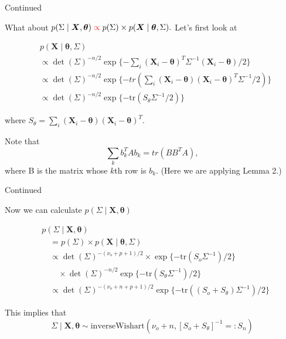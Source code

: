 \documentclass[ignorenonframetext,]{beamer}
\newcommand{\btheta}{{\bm\theta}}
\newcommand{\bX}   {\bm{X}}
\newcommand{\bx}{\ensuremath{\mathbf{X}}}
\begin{document}
\begin{frame}{Continued}

What about
\(p(\Sigma \mid \bX, \btheta) \; \textcolor{red}{\propto} \; p(\Sigma) \times p(\bX \mid \btheta, \Sigma).\)
Let's first look at

\begin{align}
&p(\bX \mid \btheta, \Sigma) \\
&\propto
\det(\Sigma)^{-n/2}\exp\{-
\sum_i (\bx_i - \btheta)^T\Sigma^{-1} (\bx_i - \btheta)/2
\}\\
&\propto
\det(\Sigma)^{-n/2}\exp\{- tr(
\sum_i  (\bx_i - \btheta)(\bx_i - \btheta)^T\Sigma^{-1}/2)
\}\\
&\propto 
\det(\Sigma)^{-n/2}\exp\{-
\text{tr}(S_\theta \Sigma^{-1}/2)
\}
\end{align}

where \(S_\theta = \sum_i (\bx_i - \btheta) (\bx_i - \btheta)^T.\)

Note that \[\sum_k b_k^TA b_k = tr(B B^T A),\] where B is the matrix
whose \(k\)th row is \(b_k.\) (Here we are applying Lemma 2.)

\end{frame}

\begin{frame}{Continued}

Now we can calculate \(p(\Sigma \mid \bX, \btheta)\)

\begin{align}
&p(\Sigma \mid \bX,  \btheta) \\ & \quad= p(\Sigma) \times p(\bX \mid \btheta, \Sigma) \\
& \quad \propto 
\det(\Sigma)^{-(\nu_o + p +1)/2} \times \exp\{
-\text{tr}(S_o\Sigma^{-1})/2
\} \\
& \qquad \times
\det(\Sigma)^{-n/2}\exp\{-
\text{tr}(S_\theta \Sigma^{-1})/2\}\\
& \quad \propto 
\det(\Sigma)^{-(\nu_o + n + p +1)/2}
\exp\{-
\text{tr}((S_o +S_\theta) \Sigma^{-1})/2\}
\end{align}

This implies that
\[\Sigma \mid \bX,  \btheta \sim \text{inverseWishart}(\nu_o + n, [S_o + S_\theta]^{-1} =: S_n)\]

\end{frame}

\end{document}
